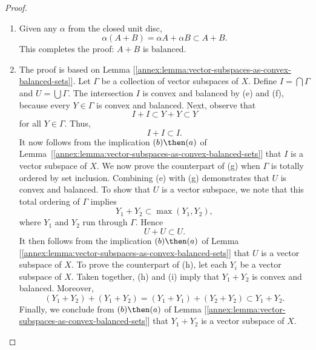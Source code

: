 \begin{proof}
\begin{enumerate}[item-label=(\alph{enumi})]
\begin{equation}
  s (A+B) + t (A+B) = s A+ t A +s B +t B = (s+t)(A+B)
\end{equation}
%
for all positive scalars $\mathit{s}$ and $\mathit{t}$, %
then conclude from (d) that $A + B$ is convex. %
\item Given any $\alpha$ from the closed unit disc, %
%
\begin{equation}
\alpha(A+B)=\alpha A+ \alpha B \subset A+B. 
\end{equation}
%
This completes the proof: $A+B$ is balanced. %
\item The proof is based on Lemma [\ref{annex:lemma:vector-subspaces-as-convex-balanced-sets}]. Let $\Gamma$ be a collection %
of vector subspaces of $X$. Define $I = \bigcap \Gamma$ and $U = \bigcup \Gamma$. The intersection $I$ is convex and balanced %
by (e) and (f), because every $Y \in \Gamma$ is convex and balanced. Next, observe that
%
\begin{equation}
  I + I \subset Y + Y \subset  Y
\end{equation}
%
for all $Y \in \Gamma$. Thus,
%
\begin{equation}
  I + I \subset I.
\end{equation}
%
It now follows from the implication $(b) \then (a)$ of Lemma~[\ref{annex:lemma:vector-subspaces-as-convex-balanced-sets}] %
that $I$ is a vector subspace of $X$. We now prove the counterpart of (g) when $\Gamma$ is totally ordered by set inclusion. 
Combining (e) with (g) demonstrates that $U$ is convex and balanced. To show that $U$ is a vector subspace, we note that this 
total ordering of $\Gamma$ implies
%
\begin{equation}
  Y_1 + Y_2  \subset \max(Y_1, Y_2),
\end{equation}
%
where $Y_1$ and $Y_2$ run through $\Gamma$. Hence%
%
\begin{equation}
  U + U \subset U.
\end{equation}
%
It then follows from the implication $(b) \then (a)$ of Lemma [\ref{annex:lemma:vector-subspaces-as-convex-balanced-sets}] %
that $U$ is a vector subspace of $X$. To prove the counterpart of (h), let each $Y_i$ be a vector subspace of $X$. Taken %
together, (h) and (i) imply that $Y_1 + Y_2$ is convex and balanced. Moreover, 
%
\begin{equation}
  (Y_1 + Y_2) + (Y_1 + Y_2) = (Y_1 + Y_1) + (Y_2 + Y_2) \subset Y_1 + Y_2.
\end{equation}
% 
Finally, we conclude from $(b) \then (a)$ of Lemma [\ref{annex:lemma:vector-subspaces-as-convex-balanced-sets}] that %
$Y_1 + Y_2$ is a vector subspace of $X$. %
\end{enumerate}
\end{proof}
